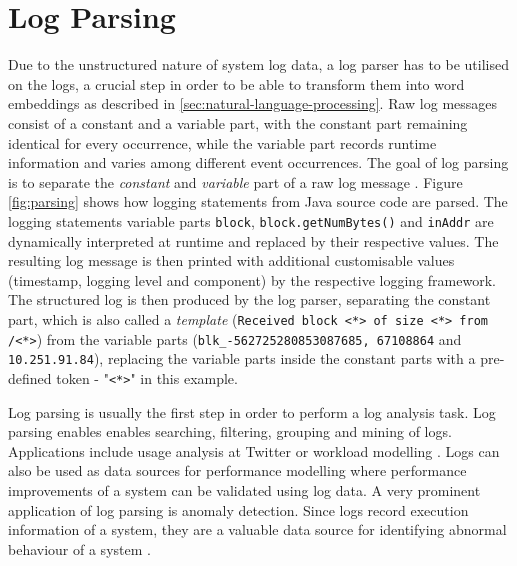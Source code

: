 \begin{comment}
Log messages are the result of the insertion of a variable part in a logging instruction (e.g. \textit{printf("Instance \%s shut down with errors, \%s)} in software code that is being output during execution. The constant parts can usually be found in source codes written by developers, while the variable parts are inserted dynamically during execution. As these logs are unstructured text, have to undergo certain pre-processing steps before they can be analysed for anomalies. Each log event can be parsed into a log template, leaving only the constant part, as it can be seen in figure \ref{fig:parsing}.
\end{comment}


\section{Log Parsing \label{sec:backgroundlogparsing}}
Due to the unstructured nature of system log data, a log parser has to be utilised on the logs, a crucial step in order to be able to transform them into word embeddings as described in \ref{sec:natural-language-processing}.
Raw log messages consist of a constant and a variable part, with the constant part remaining identical for every occurrence, while the variable part records runtime information and varies among different event occurrences. The goal of log parsing is to separate the \textit{constant} and \textit{variable} part of a raw log message \cite{he2017towards}\cite{zhu2019tools}. Figure \ref{fig:parsing} shows how logging statements from Java source code are parsed. The logging statements variable parts \verb!block!, \verb!block.getNumBytes()! and \verb!inAddr! are dynamically interpreted at runtime and replaced by their respective values. The resulting log message is then printed with additional customisable values (timestamp, logging level and component) by the respective logging framework. The structured log is then produced by the log parser, separating the constant part, which is also called a \textit{template} (\verb!Received block <*> of size <*> from /<*>!) from the variable parts (\verb!blk_-562725280853087685, 67108864! and \verb!10.251.91.84!), replacing the variable parts inside the constant parts with a pre-defined token - "\verb!<*>!" in this example.

Log parsing is usually the first step in order to perform a log analysis task. Log parsing enables enables searching, filtering, grouping and mining of logs. Applications include usage analysis at Twitter \cite{lee2012unified} or workload modelling \cite{barham2004using}. Logs can also be used as data sources for performance modelling \cite{chow2014mystery} where performance improvements of a system can be validated using log data. A very prominent application of log parsing is anomaly detection. Since logs record execution information of a system, they are a valuable data source for identifying abnormal behaviour of a system \cite{zhu2019tools}.

